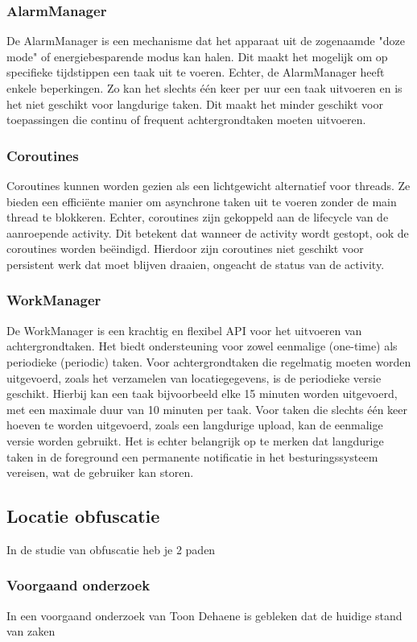 \subsubsection*{AlarmManager}
De AlarmManager is een mechanisme dat het apparaat uit de zogenaamde "doze mode" of energiebesparende modus kan halen. Dit maakt het mogelijk om op specifieke tijdstippen een taak uit te voeren. Echter, de AlarmManager heeft enkele beperkingen. Zo kan het slechts één keer per uur een taak uitvoeren en is het niet geschikt voor langdurige taken. Dit maakt het minder geschikt voor toepassingen die continu of frequent achtergrondtaken moeten uitvoeren.

\subsubsection*{Coroutines}
Coroutines kunnen worden gezien als een lichtgewicht alternatief voor threads. Ze bieden een efficiënte manier om asynchrone taken uit te voeren zonder de main thread te blokkeren. Echter, coroutines zijn gekoppeld aan de lifecycle van de aanroepende activity. Dit betekent dat wanneer de activity wordt gestopt, ook de coroutines worden beëindigd. Hierdoor zijn coroutines niet geschikt voor persistent werk dat moet blijven draaien, ongeacht de status van de activity.

\subsubsection*{WorkManager}
De WorkManager is een krachtig en flexibel API voor het uitvoeren van achtergrondtaken. Het biedt ondersteuning voor zowel eenmalige (one-time) als periodieke (periodic) taken. Voor achtergrondtaken die regelmatig moeten worden uitgevoerd, zoals het verzamelen van locatiegegevens, is de periodieke versie geschikt. Hierbij kan een taak bijvoorbeeld elke 15 minuten worden uitgevoerd, met een maximale duur van 10 minuten per taak. Voor taken die slechts één keer hoeven te worden uitgevoerd, zoals een langdurige upload, kan de eenmalige versie worden gebruikt. Het is echter belangrijk op te merken dat langdurige taken in de foreground een permanente notificatie in het besturingssysteem vereisen, wat de gebruiker kan storen.

\subsection*{Locatie obfuscatie}
In de studie van obfuscatie heb je 2 paden 
\subsubsection*{Voorgaand onderzoek}
In een voorgaand onderzoek van Toon Dehaene is gebleken dat de huidige stand van zaken 
